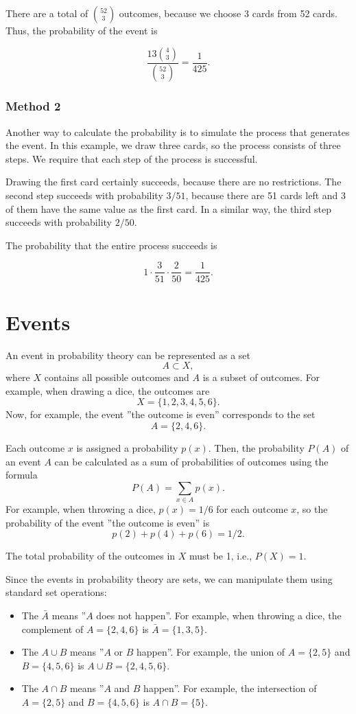 There are a total of ${52 \choose 3}$ outcomes,
because we choose 3 cards from 52 cards.
Thus, the probability of the event is

\[\frac{13 {4 \choose 3}}{{52 \choose 3}} = \frac{1}{425}.\]

\subsubsection*{Method 2}

Another way to calculate the probability is
to simulate the process that generates the event.
In this example, we draw three cards, so the process
consists of three steps.
We require that each step of the process is successful.

Drawing the first card certainly succeeds,
because there are no restrictions.
The second step succeeds with probability $3/51$,
because there are 51 cards left and 3 of them
have the same value as the first card.
In a similar way, the third step succeeds with probability $2/50$.

The probability that the entire process succeeds is

\[1 \cdot \frac{3}{51} \cdot \frac{2}{50} = \frac{1}{425}.\]

\section{Events}

An event in probability theory can be represented as a set
\[A \subset X,\]
where $X$ contains all possible outcomes
and $A$ is a subset of outcomes.
For example, when drawing a dice, the outcomes are
\[X = \{1,2,3,4,5,6\}.\]
Now, for example, the event ''the outcome is even''
corresponds to the set
\[A = \{2,4,6\}.\]

Each outcome $x$ is assigned a probability $p(x)$.
Then, the probability $P(A)$ of an event
$A$ can be calculated as a sum
of probabilities of outcomes using the formula
\[P(A) = \sum_{x \in A} p(x).\]
For example, when throwing a dice,
$p(x)=1/6$ for each outcome $x$,
so the probability of the event
''the outcome is even'' is
\[p(2)+p(4)+p(6)=1/2.\]

The total probability of the outcomes in $X$ must
be 1, i.e., $P(X)=1$.

Since the events in probability theory are sets,
we can manipulate them using standard set operations:

\begin{itemize}
\item The  $\bar A$ means
''$A$ does not happen''.
For example, when throwing a dice, 
the complement of $A=\{2,4,6\}$ is
$\bar A = \{1,3,5\}$.
\item The  $A \cup B$ means
''$A$ or $B$ happen''.
For example, the union of
$A=\{2,5\}$
and $B=\{4,5,6\}$ is
$A \cup B = \{2,4,5,6\}$.
\item The  $A \cap B$ means
''$A$ and $B$ happen''.
For example, the intersection of
$A=\{2,5\}$ and $B=\{4,5,6\}$ is
$A \cap B = \{5\}$.
\end{itemize}

